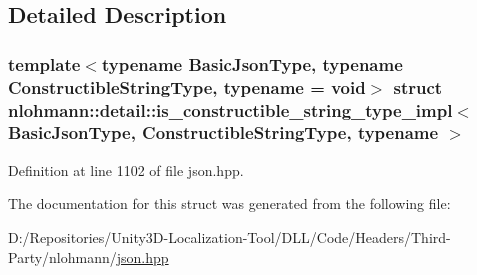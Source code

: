 \subsection{Detailed Description}
\subsubsection*{template$<$typename Basic\+Json\+Type, typename Constructible\+String\+Type, typename = void$>$\newline
struct nlohmann\+::detail\+::is\+\_\+constructible\+\_\+string\+\_\+type\+\_\+impl$<$ Basic\+Json\+Type, Constructible\+String\+Type, typename $>$}



Definition at line 1102 of file json.\+hpp.



The documentation for this struct was generated from the following file\+:\begin{DoxyCompactItemize}
\item 
D\+:/\+Repositories/\+Unity3\+D-\/\+Localization-\/\+Tool/\+D\+L\+L/\+Code/\+Headers/\+Third-\/\+Party/nlohmann/\mbox{\hyperlink{json_8hpp}{json.\+hpp}}\end{DoxyCompactItemize}
